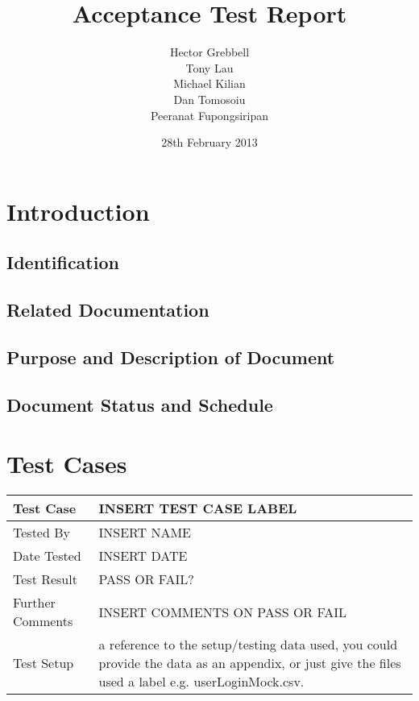 \documentclass{l3deliverable}
\title{Acceptance Test Report}
\author{
  Hector Grebbell \\
  Tony Lau \\
  Michael Kilian \\
  Dan Tomosoiu \\
  Peeranat Fupongsiripan 
}
\date{28th February 2013}
\begin{document}

\maketitle

\tableofcontents

\newpage


\section{Introduction}

\subsection{Identification}

\subsection{Related Documentation}

\subsection{Purpose and Description of Document}

\subsection{Document Status and Schedule}


\section{Test Cases}


\begin{tabular}{lp{10cm}}
\hline 
\textbf{Test Case} & INSERT TEST CASE LABEL\tabularnewline
\hline 
\hline 
Tested By & INSERT NAME\tabularnewline
\hline 
Date Tested & INSERT DATE\tabularnewline
\hline 
Test Result & PASS OR FAIL?\tabularnewline
\hline
Further Comments & INSERT COMMENTS ON PASS OR FAIL\tabularnewline
\hline
Test Setup & a reference to the setup/testing data used, you could provide the data as an appendix, or just give the files used a label e.g. userLoginMock.csv. \tabularnewline
\hline
\end{tabular}\\
\end{document}
